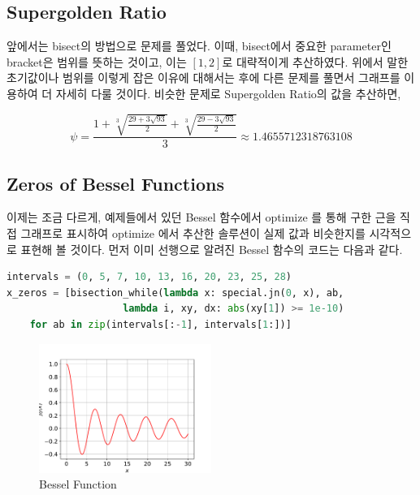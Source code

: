 \documentclass[11pt]{article}
\begin{document}
\vspace{5mm}

\vspace{5mm}

\subsection{Supergolden Ratio} 
\noindent
앞에서는 bisect의 방법으로 문제를 풀었다. 이때, bisect에서 중요한 parameter인 bracket은 범위를 뜻하는 것이고, 이는 $[1, 2]$로 대략적이게 추산하였다. 위에서 말한 초기값이나 범위를 이렇게 잡은 이유에 대해서는 후에 다른 문제를 풀면서 그래프를 이용하여 더 자세히 다룰 것이다. 비슷한 문제로 Supergolden Ratio의 값을 추산하면, 

\vspace{5mm}

\vspace{5mm}

$$
\psi = \frac{1 + \sqrt[3]{\frac{29 + 3\sqrt{93}}{2}} + \sqrt[3]{\frac{29 - 3\sqrt{93}}{2}}}{3}
\approx 1.4655712318763108
$$

\subsection{Zeros of Bessel Functions} 
\noindent
이제는 조금 다르게, 예제들에서 있던 Bessel 함수에서 optimize 를 통해 구한 근을 직접 그래프로 표시하여 optimize 에서 추산한 솔루션이 실제 값과 비슷한지를 시각적으로 표현해 볼 것이다. 먼저 이미 선행으로 알려진 Bessel 함수의 코드는 다음과 같다.

\begin{lstlisting}[language=Python]
intervals = (0, 5, 7, 10, 13, 16, 20, 23, 25, 28)
x_zeros = [bisection_while(lambda x: special.jn(0, x), ab,
                    lambda i, xy, dx: abs(xy[1]) >= 1e-10)
    for ab in zip(intervals[:-1], intervals[1:])]
\end{lstlisting}


\clearpage
\begin{figure}[!ht]
  \centering
  \includegraphics[width=0.5\textwidth]{Bessel_Functions.pdf}
  \caption{Bessel Function}
\end{figure}
\end{document}
